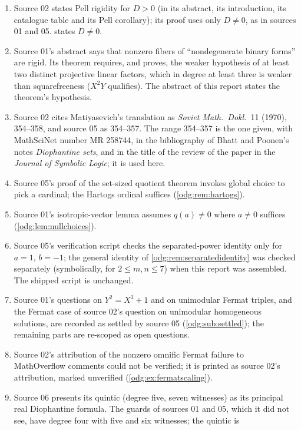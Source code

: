 \documentclass[11pt,oneside]{article}
\numberwithin{equation}{section}
\theoremstyle{definition}
\theoremstyle{remark}
\begin{document}
\begin{enumerate}[leftmargin=*]
\item Source 02 states Pell rigidity for $D>0$ (in its abstract, its
introduction, its catalogue table and its Pell corollary); its proof uses only
$D\ne0$, as in sources 01 and 05.  states $D\ne0$.
\item Source 01's abstract says that nonzero fibers of ``nondegenerate binary
forms'' are rigid. Its theorem requires, and proves, the weaker hypothesis of
at least two distinct projective linear factors, which in degree at least
three is weaker than squarefreeness ($X^2Y$ qualifies). The abstract of this
report states the theorem's hypothesis.
\item Source 02 cites Matiyasevich's translation as \emph{Soviet Math.\
Dokl.}\ 11 (1970), 354--358, and source 05 as 354--357. The range 354--357 is the
one given, with MathSciNet number MR 258744, in the bibliography of Bhatt and
Poonen's notes \emph{Diophantine sets}, and in the title of the review of the
paper in the \emph{Journal of Symbolic Logic}; it is used here.
\item Source 05's proof of the set-sized quotient theorem invokes global
choice to pick a cardinal; the Hartogs ordinal suffices
(\cref{odg:rem:hartogs}).
\item Source 01's isotropic-vector lemma assumes $q(a)\ne0$ where $a\ne0$
suffices (\cref{odg:lem:nullchoices}).
\item Source 05's verification script checks the separated-power identity only
for $a=1$, $b=-1$; the general identity of
\cref{odg:rem:separatedidentity} was checked separately (symbolically, for
$2\le m,n\le7$) when this report was assembled. The shipped script is
unchanged.
\item Source 01's questions on $Y^2=X^3+1$ and on unimodular Fermat triples,
and the Fermat case of source 02's question on unimodular homogeneous
solutions, are recorded as settled by source 05
(\cref{odg:sub:settled}); the remaining parts are re-scoped as open
questions.
\item Source 02's attribution of the nonzero omnific Fermat failure to
MathOverflow comments could not be verified; it is printed as source 02's
attribution, marked unverified (\cref{odg:ex:fermatscaling}).
\item Source 06 presents its quintic (degree five, seven witnesses) as its
principal real Diophantine formula. The guards of sources 01 and 05, which it
did not see, have degree four with five and six witnesses; the quintic is

\end{enumerate}
\end{document}
